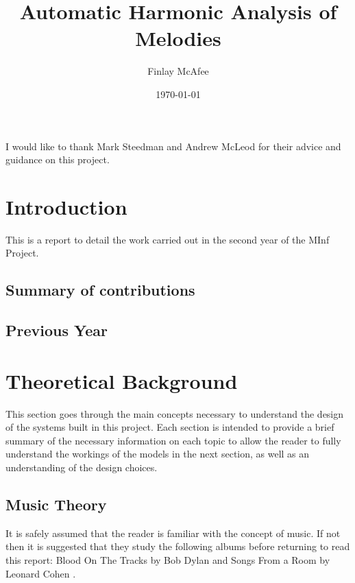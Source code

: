 \documentclass[bsc,singlespacing,logo, parskip, deptreport]{infthesis}
\begin{document}
\title{Automatic Harmonic Analysis of Melodies}

\author{Finlay McAfee}


\date{\today}

\abstract{
}

\maketitle
\begin{acknowledgements}
  I would like to thank Mark Steedman and Andrew McLeod for their advice and guidance on this project.
\end{acknowledgements}
\standarddeclaration
\tableofcontents


\chapter{Introduction}
This is a report to detail the work carried out in the second year of the MInf Project.

\section{Summary of contributions}

\section{Previous Year}


\chapter{Theoretical Background}
This section goes through the main concepts necessary to understand the design of the systems built in this project. Each section is intended to provide a brief summary of the necessary information on each topic to allow the reader to fully understand the workings of the models in the next section, as well as an understanding of the design choices.

\section{Music Theory}
It is safely assumed that the reader is familiar with the concept of music. If not then it is suggested that they study the following albums before returning to read this report: Blood On The Tracks by Bob Dylan \cite{dylan1975blood} and Songs From a Room by Leonard Cohen \cite{cohen2007songs}.
\end{document}
